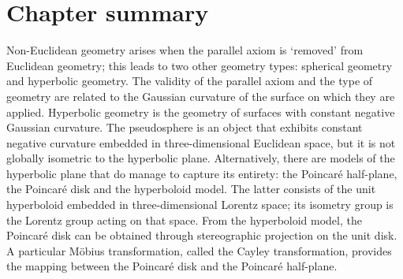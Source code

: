 \section*{Chapter summary}
Non-Euclidean geometry arises when the parallel axiom is `removed' from Euclidean geometry; this leads to two other geometry types: spherical geometry and hyperbolic geometry. The validity of the parallel axiom and the type of geometry  are related to the Gaussian curvature of the surface on which they are applied. Hyperbolic geometry is the geometry of surfaces with constant negative Gaussian curvature. The pseudosphere is an object that exhibits constant negative curvature embedded in three-dimensional Euclidean space, but it is not globally isometric to the hyperbolic plane. Alternatively, there are models of the hyperbolic plane that do manage to capture its entirety: the Poincaré half-plane, the Poincaré disk and the hyperboloid model. The latter consists of the unit hyperboloid embedded in three-dimensional Lorentz space; its isometry group is the Lorentz group acting on that space. From the hyperboloid model, the Poincaré disk can be obtained through stereographic projection on the unit disk. A particular Möbius transformation, called the Cayley transformation, provides the mapping between the Poincaré disk and the Poincaré half-plane.
